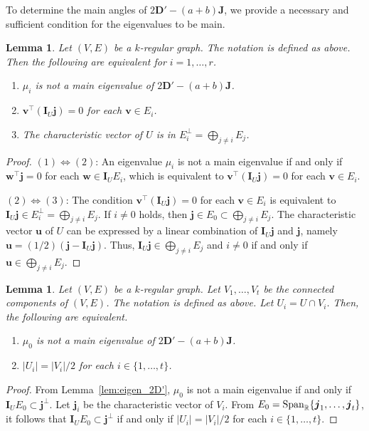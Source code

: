\documentclass[a4paper, 11pt]{article}
\newcommand{\J}{\boldsymbol{J}}
\newcommand{\I}{\boldsymbol{I}}
\newcommand{\D}{\boldsymbol{D}}
\newcommand{\jv}{\boldsymbol{j}}
\newcommand{\vv}{\boldsymbol{v}}
\newcommand{\uv}{\boldsymbol{u}}
\newtheorem{lemma}[theorem]{Lemma}
\theoremstyle{definition}
\begin{document}
To determine the main angles of $2\D'-(a+b)\J$, we provide a necessary and sufficient condition 
for the eigenvalues to be main. 
\begin{lemma} \label{lem:switch_main}
Let $(V,E)$ be a $k$-regular graph. The notation is defined as above. 
Then the following are equivalent for $i= 1,\ldots,r$.  
\begin{enumerate}
\item $\mu_i$ is not a main eigenvalue of $2\D'-(a+b)\J$. 
\item $\vv^\top(\I_U\jv) = 0$ for each $\vv \in E_i$.
\item The characteristic vector of $U$ is in 
$E_i^\perp =\bigoplus_{ j \ne i} E_j$. 
\end{enumerate}
\end{lemma}
\begin{proof}
$(1) \Leftrightarrow (2)$: An eigenvalue $\mu_i$ is not a main eigenvalue if and only if  
 $\boldsymbol{w}^\top \jv =0$ for each $\boldsymbol{w} \in \I_U E_i$, which is equivalent to $\vv^\top(\I_U\jv) = 0$ for each $\vv \in E_i$.  

$(2) \Leftrightarrow (3)$: The condition $\vv^\top(\I_U\jv) = 0$ for each $\vv \in E_i$ is equivalent to $\I_U\jv \in E_i^\perp =\bigoplus_{ j \ne i} E_j$. 
If $i \ne 0$ holds, then $\jv \in E_0 \subset \bigoplus_{ j \ne i} E_j$. 
The characteristic vector $\uv$ of $U$ can be expressed by a linear combination of  $\I_U\jv$ and $\jv$, namely $\uv=(1/2)(\jv-\I_U\jv)$.
Thus, $\I_U\jv \in \bigoplus_{ j \ne i} E_j$ and $i \ne 0$ if and only if $\uv \in \bigoplus_{ j \ne i} E_j$. 
\end{proof}
\begin{lemma} \label{lem:mu_0_main}
Let $(V,E)$ be a $k$-regular graph. 
Let $V_1,\ldots, V_t$ be the connected components of $(V,E)$.  
The notation is defined as above. 
Let $U_i=U \cap V_i $. 
Then, the following are equivalent.
\begin{enumerate}
    \item $\mu_0$ is not a main eigenvalue of $2\D'-(a+b)\J$. 
    \item $|U_i|=|V_i|/2$ for each $i \in \{1,\ldots, t\}$. 
\end{enumerate} 
\end{lemma}

\begin{proof}
From Lemma~\ref{lem:eigen_2D'}, $\mu_0$ is not a main eigenvalue 
if and only if $\I_U E_0 \subset \jv^\perp $. 
Let $\jv_{i}$ be the characteristic vector of $V_i$. 
From $E_0={\rm Span}_{\mathbb{R}}\{ \jv_{1},\ldots, \jv_{t} \}$, it follows that  $\I_U E_0 \subset \jv^\perp $ if and only if 
$|U_i|=|V_i|/2$ for each $i \in \{1,\ldots, t\}$. 
\end{proof}
\end{document}

